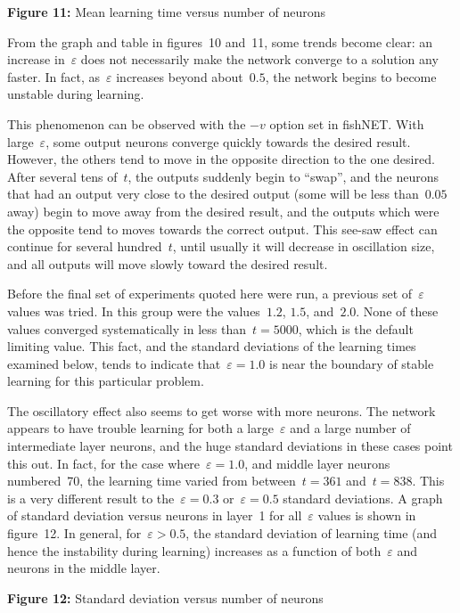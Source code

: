 \documentclass[12pt]{report}
\begin{document}
\par\textbf{Figure 11:} Mean learning time versus number of neurons

From the graph and table in figures~10 and~11, some trends become
clear: an increase in~$\varepsilon$ does not necessarily make the
network converge to a solution any faster.
In fact, as~$\varepsilon$ increases beyond about~$0.5$, the network
begins to become unstable during learning.

This phenomenon can be observed with the $-v$ option set in
fishNET.
With large~$\varepsilon$, some output neurons converge quickly
towards the desired result.
However, the others tend to move in the opposite direction to the
one desired.
After several tens of~$t$, the outputs suddenly begin to ``swap'',
and the neurons that had an output very close to the desired output
(some will be less than~$0.05$ away) begin to move away from the
desired result, and the outputs which were the opposite tend to
moves towards the correct output.
This see-saw effect can continue for several hundred~$t$, until
usually it will decrease in oscillation size, and all outputs will move 
slowly toward the desired result.

Before the final set of experiments quoted here were run, a previous
set of~$\varepsilon$ values was tried.
In this group were the values~$1.2$, $1.5$, and~$2.0$.
None of these values converged systematically in less than~$t =
5000$, which is the default limiting value.
This fact, and the standard deviations of the learning times examined
below, tends to indicate that~$\varepsilon = 1.0$ is near the boundary
of stable learning for this particular problem.

The oscillatory effect also seems to get worse with more neurons.
The network appears to have trouble learning for both a
large~$\varepsilon$ and a large number of intermediate layer neurons,
and the huge standard deviations in these cases point this out.
In fact, for the case where~$\varepsilon = 1.0$, and middle layer
neurons numbered~70, the learning time varied from 
between~$t=361$ and~$t=838$.
This is a very different result to the~$\varepsilon = 0.3$ 
or~$\varepsilon = 0.5$ standard deviations.
A graph of standard deviation versus neurons in layer~1 for
all~$\varepsilon$ values is shown in figure~12.
In general, for~$\varepsilon > 0.5$, the standard deviation of
learning time (and hence the instability during learning) increases
as a function of both~$\varepsilon$ and neurons in the middle layer.
\par\textbf{Figure 12:} Standard deviation versus number of neurons
\end{document}
